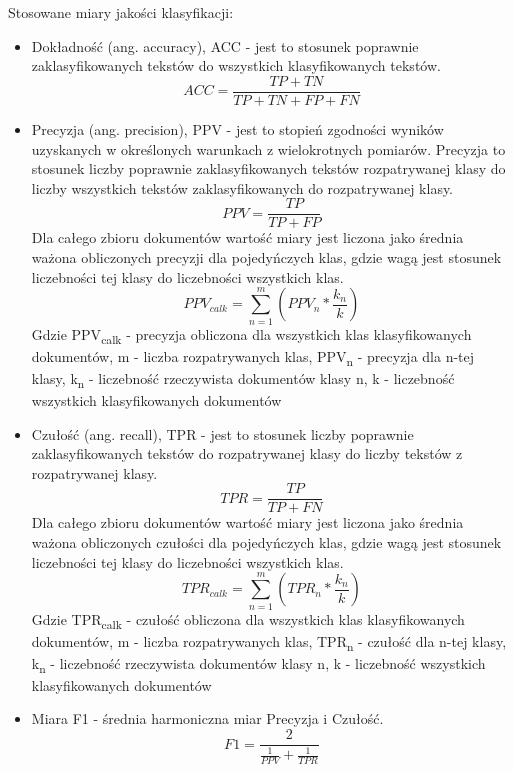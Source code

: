 \documentclass{classrep}
\begin{document}
\ \\ \\ 
Stosowane miary jakości klasyfikacji:\\
\begin{itemize}
  \item Dokładność (ang. accuracy), ACC  - jest to stosunek poprawnie zaklasyfikowanych tekstów do wszystkich klasyfikowanych tekstów.
 \begin{equation}ACC = \frac{TP + TN}{TP + TN + FP + FN} \end{equation}
 \item Precyzja (ang. precision), PPV  - jest to stopień zgodności wyników uzyskanych w określonych warunkach z wielokrotnych pomiarów. Precyzja to stosunek liczby poprawnie zaklasyfikowanych tekstów rozpatrywanej klasy do liczby wszystkich tekstów zaklasyfikowanych do rozpatrywanej klasy. 
\begin{equation} PPV =  \frac{TP} {TP+FP} \end{equation} 
Dla całego zbioru dokumentów wartość miary jest liczona jako średnia ważona obliczonych precyzji dla pojedyńczych klas, gdzie wagą jest stosunek liczebności tej klasy do liczebności wszystkich klas. 
\begin{equation} PPV_{calk} = \sum_{n=1}^{m} (PPV_n *\frac{k_n}{k}) \end{equation}
Gdzie PPV\textsubscript{calk} - precyzja obliczona dla wszystkich klas klasyfikowanych dokumentów,  m - liczba rozpatrywanych klas, PPV\textsubscript{n} - precyzja dla n-tej klasy, 
 k\textsubscript{n} - liczebność rzeczywista dokumentów klasy n, k - liczebność wszystkich klasyfikowanych dokumentów\\
\item Czułość (ang. recall), TPR  - jest to stosunek liczby poprawnie zaklasyfikowanych tekstów do rozpatrywanej klasy do liczby tekstów z rozpatrywanej klasy. 
 \begin{equation}   TPR = \frac{TP}{TP + FN} \end{equation}
Dla całego zbioru dokumentów wartość miary jest liczona jako średnia ważona obliczonych czułości dla pojedyńczych klas, gdzie wagą jest stosunek liczebności tej klasy do liczebności wszystkich klas. 
\begin{equation} TPR_{calk} = \sum_{n=1}^{m} (TPR_n *\frac{k_n}{k}) \end{equation}
Gdzie TPR\textsubscript{calk} - czułość obliczona dla wszystkich klas klasyfikowanych dokumentów,  m - liczba rozpatrywanych klas, TPR\textsubscript{n} - czułość dla n-tej klasy,  k\textsubscript{n} - liczebność rzeczywista dokumentów klasy n, k - liczebność wszystkich klasyfikowanych dokumentów\\
\item Miara F1 - średnia harmoniczna miar Precyzja i Czułość. 
\begin{equation}   F1 = \frac{2}{\frac{1}{PPV} + \frac{1}{TPR}} \end{equation}
\end{itemize}
\end{document}
